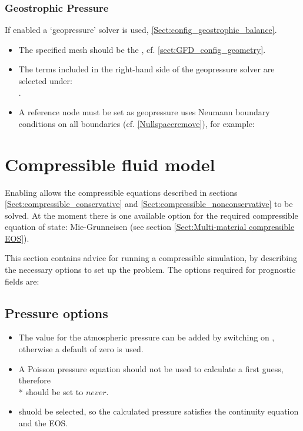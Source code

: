 \subsubsection{Geostrophic Pressure}
\label{Sect:GFD_config_geopressure}
If enabled a `geopressure' solver is used, \ref{Sect:config_geostrophic_balance}. 
\begin{itemize}
\item The specified mesh should be the , cf. \ref{sect:GFD_config_geometry}. 
\item The terms included in the right-hand side of the geopressure solver are selected under: \\
.
\item A reference node must be set as geopressure uses Neumann boundary conditions on all boundaries (cf. \ref{Nullspaceremove}), for example:
\end{itemize}

\section{Compressible fluid model}

Enabling  allows the compressible equations described in sections 
\ref{Sect:compressible_conservative} and \ref{Sect:compressible_nonconservative} to be solved. At the moment there is one available option for the required 
compressible equation of state: Mie-Grunneisen (see section \ref{Sect:Multi-material compressible EOS}).

This section contains advice for running a compressible simulation, by describing the necessary options to set up the problem. The options required for prognostic fields are:

\subsection{Pressure options}
\begin{itemize}
\item The value for the atmospheric pressure can be added by switching on , otherwise a default of zero is used.
\item A Poisson pressure equation should not be used to calculate a first guess, therefore \\*  should be set to $never$.
\item {} shuold be selected, so the calculated pressure satisfies the continuity equation and the EOS.
\end{itemize}

